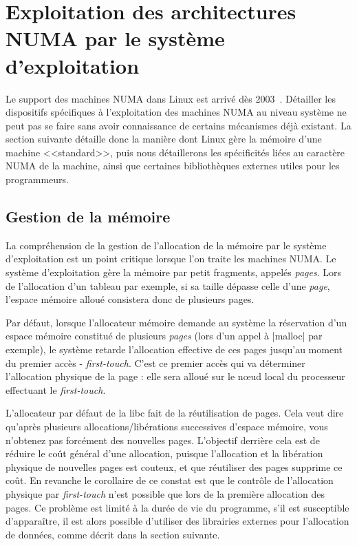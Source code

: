 \section{Exploitation des architectures NUMA par le système d'exploitation}\label{sec:context:os}

Le support des machines NUMA dans Linux est arrivé dès 2003~\cite{Dobson2003}.
Détailler les dispositifs spécifiques à l'exploitation des machines NUMA au niveau système ne peut pas se faire sans avoir connaissance de certains mécanismes déjà existant.
La section suivante détaille donc la manière dont Linux gère la mémoire d'une machine <<standard>>, puis nous détaillerons les spécificités liées au caractère NUMA de la machine, ainsi que certaines bibliothèques externes utiles pour les programmeurs.

\subsection{Gestion de la mémoire}

La compréhension de la gestion de l'allocation de la mémoire par le système d'exploitation est un point critique lorsque l'on traite les machines NUMA.
Le système d'exploitation gère la mémoire par petit fragments, appelés \emph{pages}.
Lors de l'allocation d'un tableau par exemple, si sa taille dépasse celle d'une \emph{page}, l'espace mémoire alloué consistera donc de plusieurs pages.


Par défaut, lorsque l'allocateur mémoire demande au système la réservation d'un espace mémoire constitué de plusieurs \emph{pages} (lors d'un appel à |malloc| par exemple), le système retarde l'allocation effective de ces pages jusqu'au moment du premier accès - \emph{first-touch}.
C'est ce premier accès qui va déterminer l'allocation physique de la page : elle sera alloué sur le nœud local du processeur effectuant le \emph{first-touch}.

L'allocateur par défaut de la libc fait de la réutilisation de pages. Cela veut dire qu'après plusieurs allocations/libérations successives d'espace mémoire, vous n'obtenez pas forcément des nouvelles pages.
L'objectif derrière cela est de réduire le coût général d'une allocation, puisque l'allocation et la libération physique de nouvelles pages est couteux, et que réutiliser des pages supprime ce coût.
En revanche le corollaire de ce constat est que le contrôle de l'allocation physique par \emph{first-touch} n'est possible que lors de la première allocation des pages.
Ce problème est limité à la durée de vie du programme, s'il est susceptible d'apparaître, il est alors possible d'utiliser des librairies externes pour l'allocation de données, comme décrit dans la section suivante.

